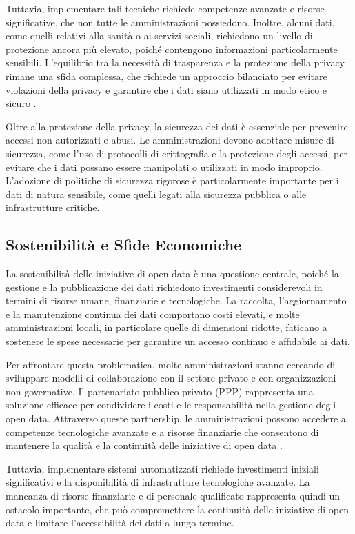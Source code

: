 Tuttavia, implementare tali tecniche richiede competenze avanzate e risorse significative, che non tutte le amministrazioni possiedono. Inoltre, alcuni dati, come quelli relativi alla sanità o ai servizi sociali, richiedono un livello di protezione ancora più elevato, poiché contengono informazioni particolarmente sensibili. L'equilibrio tra la necessità di trasparenza e la protezione della privacy rimane una sfida complessa, che richiede un approccio bilanciato per evitare violazioni della privacy e garantire che i dati siano utilizzati in modo etico e sicuro \cite{Gurumurthy2019}.

Oltre alla protezione della privacy, la sicurezza dei dati è essenziale per prevenire accessi non autorizzati e abusi. Le amministrazioni devono adottare misure di sicurezza, come l’uso di protocolli di crittografia e la protezione degli accessi, per evitare che i dati possano essere manipolati o utilizzati in modo improprio. L’adozione di politiche di sicurezza rigorose è particolarmente importante per i dati di natura sensibile, come quelli legati alla sicurezza pubblica o alle infrastrutture critiche.

\subsection{Sostenibilità e Sfide Economiche}

La sostenibilità delle iniziative di open data è una questione centrale, poiché la gestione e la pubblicazione dei dati richiedono investimenti considerevoli in termini di risorse umane, finanziarie e tecnologiche. La raccolta, l’aggiornamento e la manutenzione continua dei dati comportano costi elevati, e molte amministrazioni locali, in particolare quelle di dimensioni ridotte, faticano a sostenere le spese necessarie per garantire un accesso continuo e affidabile ai dati.

Per affrontare questa problematica, molte amministrazioni stanno cercando di sviluppare modelli di collaborazione con il settore privato e con organizzazioni non governative. Il partenariato pubblico-privato (PPP) rappresenta una soluzione efficace per condividere i costi e le responsabilità nella gestione degli open data. Attraverso queste partnership, le amministrazioni possono accedere a competenze tecnologiche avanzate e a risorse finanziarie che consentono di mantenere la qualità e la continuità delle iniziative di open data \cite{McKinsey2013}.

 Tuttavia, implementare sistemi automatizzati richiede investimenti iniziali significativi e la disponibilità di infrastrutture tecnologiche avanzate. La mancanza di risorse finanziarie e di personale qualificato rappresenta quindi un ostacolo importante, che può compromettere la continuità delle iniziative di open data e limitare l'accessibilità dei dati a lungo termine.

